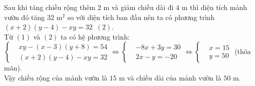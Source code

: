 \begin{bt}
{\begin{enumerate}
		Sau khi tăng chiều rộng thêm $2$ m và giảm chiều dài đi $4$ m thì diện tích mảnh vườn đó tăng $32$ m$^2$ so với diện tích ban đầu nên ta có phương trình $(x+2)(y-4)-xy=32\,\,\,(2)$.\\
		Từ $(1)$ và $(2)$ ta có hệ phương trình:\\ 
		$\left\{\begin{aligned}
		&xy-(x-3)(y+8)=54\\&(x+2)(y-4)-xy=32
		\end{aligned}\right.\Leftrightarrow
		\left\{\begin{aligned}
		&-8x+3y=30\\ &2x-y=-20
		\end{aligned}\right.\Leftrightarrow
		\left\{\begin{aligned}
		&x=15\\ &y=50
		\end{aligned}\right.$ (thõa mãn).\\
		Vậy chiều rộng của mảnh vườn là $15$ m và chiều dài của mảnh vườn là $50$ m.
	\end{enumerate}		
	}
\end{bt}
